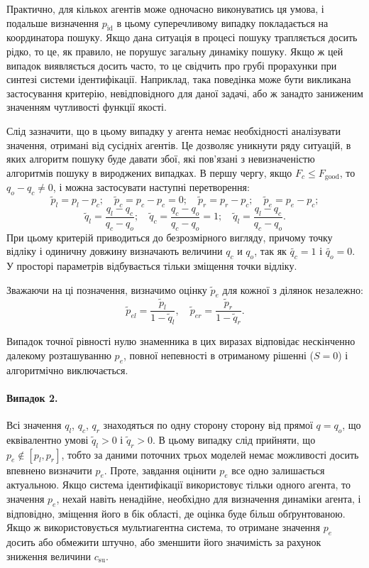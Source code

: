 Практично, для кількох агентів може одночасно виконуватись
ця умова, і подальше визначення
$p_\mathrm{id}$ в цьому суперечливому випадку покладається на
координатора пошуку. Якщо дана ситуація в процесі пошуку
трапляється досить рідко, то це, як правило, не порушує загальну
динаміку пошуку. Якщо ж цей випадок виявляється досить часто,
то це свідчить про грубі прорахунки при синтезі системи
ідентифікації. Наприклад, така поведінка може бути викликана
застосування критерію, невідповідного для даної задачі,
або ж занадто заниженим значенням чутливості функції якості.

Слід зазначити, що в цьому випадку у агента немає необхідності
аналізувати значення, отримані від сусідніх агентів. Це дозволяє
уникнути ряду ситуацій, в яких алгоритм пошуку буде давати
збої, які пов'язані з невизначеністю алгоритмів пошуку в вироджених
випадках.
%
В першу чергу, якщо
$F_c \le F_\mathrm{good}$, то $q_o -q_c \ne 0$,
і можна застосувати наступні перетворення:
%
\[
  \tilde{p}_l = p_l - p_c;
  \quad
  \tilde{p}_c = p_c - p_c = 0;
  \quad
  \tilde{p}_r = p_r - p_c;
  \quad
  \tilde{p}_e = p_e - p_c;
\]
%
\begin{equation}
  \tilde{q}_l = \frac{q_l-q_c}{q_c-q_o};
  \quad
  \tilde{q}_c = \frac{q_c-q_o}{q_c-q_o} = 1;
  \quad
  \tilde{q}_l = \frac{q_l-q_c}{q_c-q_o}.
  \label{atu:eq:q_agent_rel}
\end{equation}
%
При цьому критерій приводиться до безрозмірного вигляду,
причому точку відліку і одиничну довжину визначають величини
$q_c$ и $q_o$, так як $\tilde{q_c} = 1$ і $\tilde{q_o} = 0$.
У просторі параметрів відбувається тільки зміщення точки відліку.

Зважаючи на ці позначення, визначимо оцінку
$\tilde{p}_e$
для кожної з ділянок незалежно:
%
\begin{equation}
  \tilde{p}_{el} = \frac{\tilde{p}_l}{1-\tilde{q}_l},
  \quad
  \tilde{p}_{er} = \frac{\tilde{p}_r}{1-\tilde{q}_r}.
  \label{atu:eq:pr_ex}
\end{equation}

Випадок точної рівності нулю знаменника в цих виразах відповідає нескінченно
далекому розташуванню $p_e$, повної непевності в отриманому рішенні ($S = 0$)
і алгоритмічно виключається.


\paragraph{Випадок 2.} %
%
Всі значення
$q_l$, $q_c$, $q_r$ знаходяться по одну сторону сторону від прямої
$q = q_o$, що еквівалентно умові
$\tilde{q}_l> 0$ і $\tilde{q}_r> 0$.
В цьому випадку слід прийняти, що
$p_e \notin [p_l, p_r]$, тобто за даними поточних трьох моделей немає
можливості досить впевнено визначити
$p_e$. Проте, завдання оцінити
$p_e$ все одно залишається актуальною. Якщо система ідентифікації
використовує тільки одного агента, то значення
$p_e$, нехай навіть ненадійне, необхідно для визначення динаміки
агента, і відповідно, зміщення його в бік області, де оцінка буде
більш обґрунтованою. Якщо ж використовується мультиагентна
система, то отримане значення
$p_e$ досить або обмежити штучно, або зменшити його значимість
за рахунок зниження величини
$c_\mathrm{su}$.

